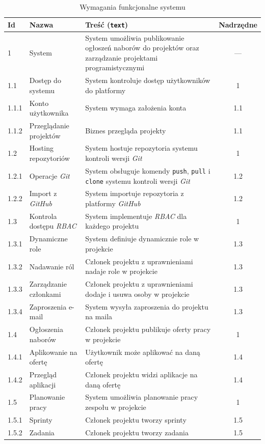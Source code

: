 \begin{table}[htb]
    \centering
    \caption{Wymagania funkcjonalne systemu}
    \label{tab:wymagania-funkcjonalne}
    \small
    \begin{tabularx}{\linewidth}{@{}l >{\raggedright\arraybackslash}p{3.5cm} >{\raggedright\arraybackslash}X c@{}}
        \toprule
        Id & Nazwa & Treść (\texttt{text}) & Nadrzędne \\
        \midrule
        1     & System & System umożliwia publikowanie ogłoszeń naborów do projektów oraz zarządzanie projektami programistycznymi & --- \\
        \midrule
        1.1   & Dostęp do systemu       & System kontroluje dostęp użytkowników do platformy & 1 \\
        1.1.1 & Konto użytkownika       & System wymaga założenia konta & 1.1 \\
        1.1.2 & Przeglądanie projektów  & Biznes przegląda projekty & 1.1 \\
        \midrule
        1.2   & Hosting repozytoriów    & System hostuje repozytoria systemu kontroli wersji \emph{Git} & 1 \\
        1.2.1 & Operacje \emph{Git}     & System obsługuje komendy \texttt{push}, \texttt{pull} i \texttt{clone} systemu kontroli wersji \emph{Git} & 1.2 \\
        1.2.2 & Import z \emph{GitHub}  & System importuje repozytoria z platformy \emph{GitHub} & 1.2 \\
        \midrule
        1.3   & Kontrola dostępu \emph{RBAC} & System implementuje \emph{RBAC} dla każdego projektu & 1 \\
        1.3.1 & Dynamiczne role         & System definiuje dynamicznie role w projekcie & 1.3 \\
        1.3.2 & Nadawanie ról           & Członek projektu z uprawnieniami nadaje role w projekcie & 1.3 \\
        1.3.3 & Zarządzanie członkami   & Członek projektu z uprawnieniami dodaje i usuwa osoby w projekcie & 1.3 \\
        1.3.4 & Zaproszenia e-mail      & System wysyła zaproszenia do projektu na maila & 1.3 \\
        \midrule
        1.4   & Ogłoszenia naborów      & Członek projektu publikuje oferty pracy w projekcie & 1 \\
        1.4.1 & Aplikowanie na ofertę   & Użytkownik może aplikować na daną ofertę & 1.4 \\
        1.4.2 & Przegląd aplikacji      & Członek projektu widzi aplikacje na daną ofertę & 1.4 \\
        \midrule
        1.5   & Planowanie pracy        & System umożliwia planowanie pracy zespołu w projekcie & 1 \\
        1.5.1 & Sprinty                 & Członek projektu tworzy sprinty & 1.5 \\
        1.5.2 & Zadania                 & Członek projektu tworzy zadania & 1.5 \\
        \bottomrule
    \end{tabularx}
\end{table}

